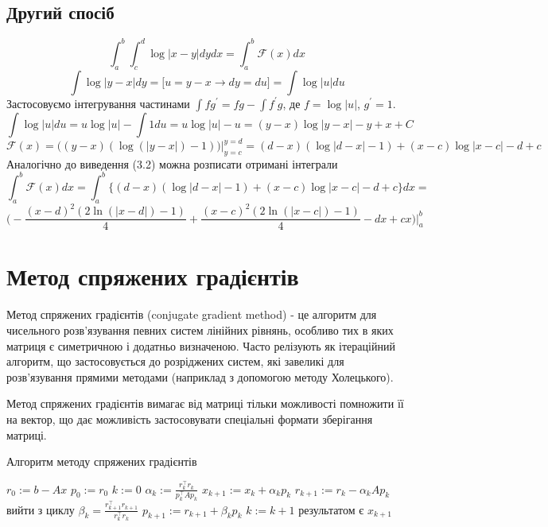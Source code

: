 \documentclass[12pt]{report}
\begin{document}
	\subsection{Другий спосіб}
		$$\int_{a}^{b}\int_{c}^{d}\log\big| x-y \big|dydx=\int_{a}^{b}\mathcal{F}(x)dx$$
		$$\int\log\big| y-x \big|dy = \big[u=y-x\rightarrow dy=du\big]=\int\log| u|du$$
		Застосовуємо інтегрування частинами $\int fg^\prime = fg-\int f^\prime g$, де $f=\log|u|$, $g^\prime =1$.
		$$\int\log| u|du = u\log|u|-\int 1du = u\log|u|-u = (y-x)\log\big|y-x\big|-y+x+C$$
		$$\mathcal{F}(x)=\Bigg(\left(y-x\right)\left(\log\left(\left|y-x\right|\right)-1\right)\Bigg)\Bigg|_{y=c}^{y=d}=\left(d-x\right)\left(\log\left|d-x\right|-1\right)+(x-c)\log|x-c|-d+c$$
		Аналогічно до виведення (3.2) можна розписати отримані інтеграли
		$$\int_{a}^{b}\mathcal{F}(x)dx = \int_{a}^{b}\Bigg\{\left(d-x\right)\left(\log\left|d-x\right|-1\right)+(x-c)\log|x-c|-d+c\Bigg\}dx =$$
		$$\Bigg(-\dfrac{\left(x-d\right)^2\left(2\ln\left(\left|x-d\right|\right)-1\right)}{4}+\dfrac{\left(x-c\right)^2\left(2\ln\left(\left|x-c\right|\right)-1\right)}{4}-dx+cx\Bigg)\Bigg|_{a}^{b}$$
	\section{Метод спряжених градієнтів}
	\par Метод спряжених градієнтів (conjugate gradient method) - це алгоритм для чисельного розв'язування певних систем лінійних рівнянь, особливо тих в яких матриця є симетричною і додатньо визначеною. Часто релізують як ітераційний алгоритм, що застосовується до розріджених систем, які завеликі для розв'язування прямими методами (наприклад з допомогою методу Холецького).
	\par Метод спряжених градієнтів вимагає від матриці тільки можливості помножити її на вектор, що дає можливість застосовувати спеціальні формати зберігання матриці.
	\begin{algorithm}
	\caption{Алгоритм методу спряжених градієнтів}
	\begin{algorithmic}
		\STATE $r_0:=b-Ax$
		\STATE $p_0:=r_0$
		\STATE $k:=0$
			\STATE $\alpha_k:=\frac{r_k^{\intercal}r_k}{p_k^{\intercal}Ap_k}$
			\STATE $x_{k+1}:=x_k+\alpha_kp_k$
			\STATE $r_{k+1}:=r_k-\alpha_kAp_k$
				\STATE вийти з циклу
			\ENDIF
			\STATE $\beta_k=\frac{r_{k+1}^{\intercal}r_{k+1}}{r_k^\intercal r_k}$
			\STATE $p_{k+1}:=r_{k+1}+\beta_kp_k$
			\STATE $k:=k+1$
		\ENDWHILE
		\STATE результатом є $x_{k+1}$
	\end{algorithmic}
	
	\end{algorithm}
\end{document}
